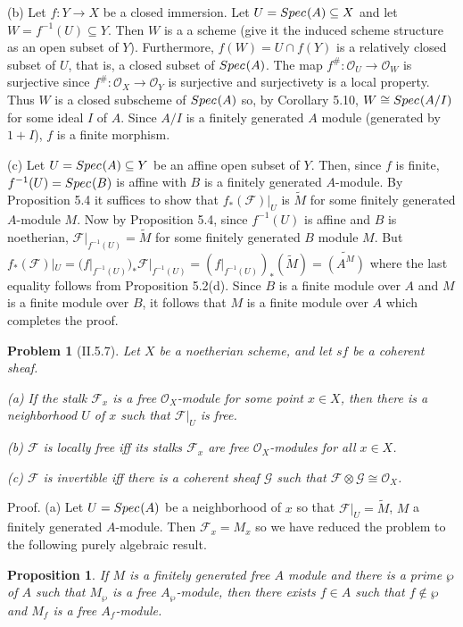 \documentclass[12pt]{article}
\newcommand{\so}{\mathcal{O}}
\newcommand{\sox}{\mathcal{O}_X}
\newcommand{\soy}{\mathcal{O}_Y}
\renewcommand{\sf}{\mathcal{F}}
\newcommand{\sg}{\mathcal{G}}
\newcommand{\tensor}{\otimes}
\newcommand{\isom}{\cong}
\newcommand{\into}{\rightarrow}
\newcommand{\ru}{|_U}
\newtheorem{prob}{Problem}
\newtheorem{prop}{Proposition}
\newcommand{\fh}{f^{\#}}
\newcommand{\spec}{Spec \hspace{.01in}}
\newcommand{\proof}{\mbox{\sc Proof.\hspace{.1in}}}
\begin{document}
(b) Let $f:Y\into X$ be a closed immersion. Let $U=\spec(A)
\subseteq X$ and let $W=f^{-1}(U)\subseteq Y$. Then
$W$ is a a scheme (give it the induced scheme structure as
an open subset of $Y$). Furthermore, 
$f(W)=U\cap f(Y)$ is a relatively closed subset of $U$,
that is, a closed subset of $\spec(A)$. The
map $\fh:\so_{U}\into\so_{W}$ is surjective since
$\fh:\sox\into\soy$ is surjective and surjectivety
is a local property. Thus $W$ is a closed subscheme
of $\spec(A)$ so, by Corollary 5.10, $W\cong\spec(A/I)$
for some ideal $I$ of $A$. Since $A/I$ is a finitely
generated $A$ module (generated by $1+I$), $f$
is a finite morphism.

(c) Let $U=\spec(A)\subseteq Y$ be an affine open subset
of $Y$. Then, since $f$ is finite, $f^{-1}(U)=\spec(B)$
is affine with $B$ is a finitely generated $A$-module. 
By Proposition 5.4 it suffices to show that 
$f_{*}(\sf)|_U$ is $\tilde{M}$ for some finitely
generated $A$-module $M$. Now by Proposition 5.4,
since $f^{-1}(U)$ is affine and $B$ is noetherian,
$\sf|_{f^{-1}(U)}=\tilde{M}$ for some finitely
generated $B$ module $M$. 
But 
$f_{*}(\sf)|_U=(f|_{f^{-1}(U)})_{*}\sf|_{f^{-1}(U)}
=(f|_{f^{-1}(U)})_{*}(\tilde{M})=\tilde{(A^M)}$
where the last equality follows from Proposition 5.2(d).
Since $B$ is a finite module over $A$ and $M$
is a finite module over $B$, it follows that $M$
is a finite module over $A$ which completes the proof. 

\begin{prob}[II.5.7]
Let $X$ be a noetherian scheme, and let $sf$ be a coherent sheaf.

(a) If the stalk $\sf_x$ is a free $\sox$-module for some point
$x\in X$, then there is a neighborhood $U$ of $x$ such that $\sf|_U$ 
is free. 

(b) $\sf$ is locally free iff its stalks $\sf_x$ are free $\sox$-modules
for all $x\in X$.

(c) $\sf$ is invertible iff there is a coherent sheaf $\sg$ such
that $\sf\tensor\sg\isom\sox$. 
\end{prob}
\proof
(a) Let $U=\spec(A)$ be a neighborhood of $x$ so that
$\sf\ru=\tilde{M}$, $M$ a finitely generated $A$-module.
Then $\sf_x=M_x$ so we have reduced the problem to
the following purely algebraic result.
\begin{prop}
If $M$ is a finitely generated free $A$ module and there
is a prime $\wp$ of $A$ such that $M_{\wp}$ is a free
$A_{\wp}$-module, then there exists $f\in A$ such that
$f\not\in\wp$ and $M_f$ is a free $A_f$-module. 
\end{prop}
\end{document}
